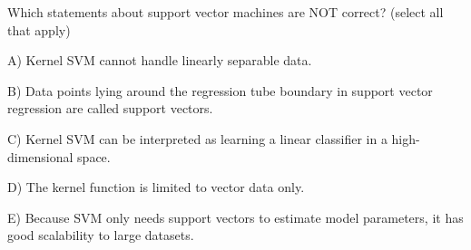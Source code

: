 Which statements about support vector machines are NOT correct? (select all that apply)


A) Kernel SVM cannot handle linearly separable data.


B) Data points lying around the regression tube boundary in support vector regression are called support vectors.


C) Kernel SVM can be interpreted as learning a linear classifier in a high-dimensional space.


D) The kernel function is limited to vector data only.


E) Because SVM only needs support vectors to estimate model parameters, it has good scalability to large datasets.
